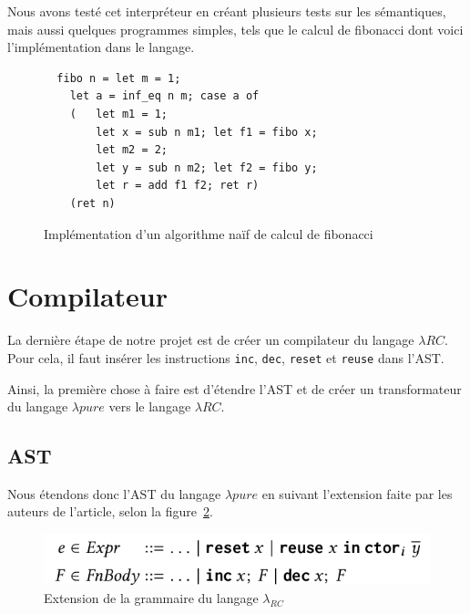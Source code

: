 \documentclass{rapportECL}
\begin{document}
\bigskip

Nous avons testé cet interpréteur en créant plusieurs tests sur les sémantiques, mais aussi quelques programmes simples, 
tels que le calcul de fibonacci dont voici l'implémentation dans le langage.

\begin{figure}[H]
	\begin{lstlisting}
  fibo n = let m = 1;
    let a = inf_eq n m; case a of
    (   let m1 = 1;
        let x = sub n m1; let f1 = fibo x;
        let m2 = 2;
        let y = sub n m2; let f2 = fibo y;
        let r = add f1 f2; ret r)
    (ret n)
	\end{lstlisting}
	\caption{Implémentation d'un algorithme naïf de calcul de fibonacci}
	\label{listing:fibo_naif}
\end{figure}
\FloatBarrier 

\section{Compilateur}

La dernière étape de notre projet est de créer un compilateur du langage $\lambda{RC}$. Pour cela, il faut insérer les 
instructions \verb|inc|, \verb|dec|, \verb|reset| et \verb|reuse| dans l'AST. 

Ainsi, la première chose à faire est
d'étendre l'AST et de créer un transformateur du langage $\lambda{pure}$ vers le langage $\lambda{RC}$.

\subsection{AST}

Nous étendons donc l'AST du langage $\lambda{pure}$ en suivant l'extension faite par les auteurs de l'article\cite{ullrich_counting_2020},
selon la figure~\ref{fig:grammaire RC}.

\begin{figure}[hbt!]
	\centering
	\includegraphics[scale=0.40]{logos/grammaire_RC.png}
	\caption{Extension de la grammaire du langage $\lambda_{RC}$}
	\label{fig:grammaire RC}
\end{figure}
\FloatBarrier 
\end{document}
